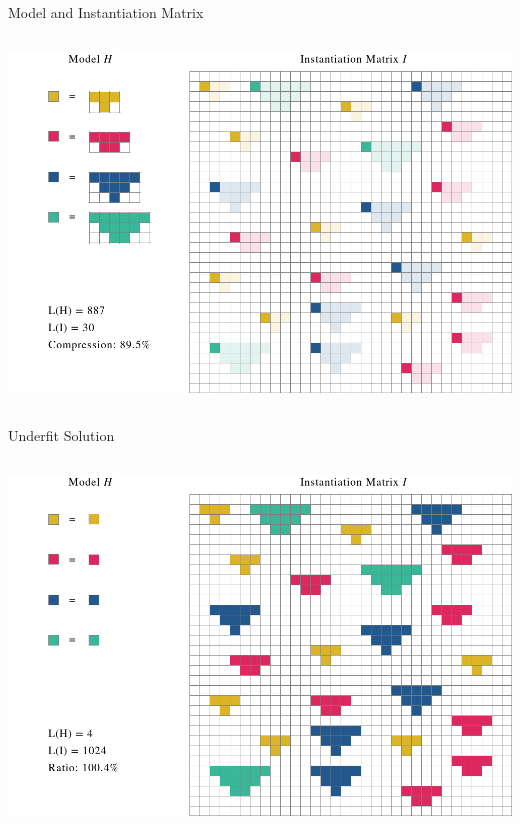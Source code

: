 \documentclass[11pt]{beamer}
\begin{document}
\begin{frame}{Model and Instantiation Matrix}
\nointerlineskip%
\begin{columns}
\column{\dimexpr\paperwidth}
\centering
\includegraphics[scale=.3]{"triangles_compressed2"} 
\end{columns}
\end{frame}


\begin{frame}{Underfit Solution}
\nointerlineskip%
\begin{columns}
\column{\dimexpr\paperwidth}
\centering
\includegraphics[scale=.3]{"triangles_underfit"} 
\end{columns}
\end{frame}

\end{document}
